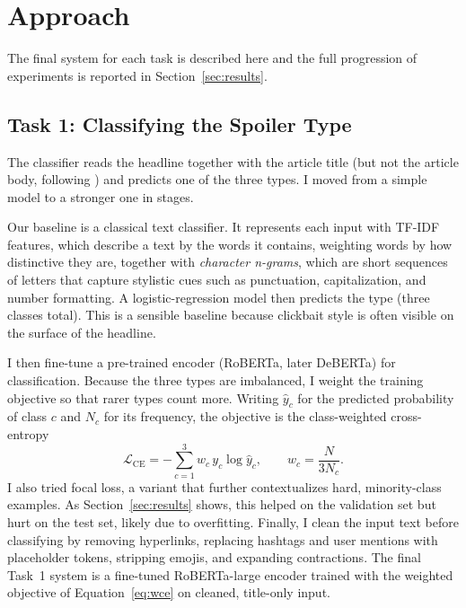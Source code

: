 \documentclass[11pt]{article}
\begin{document}
\section{Approach}
\label{sec:approach}
The final system for each task is described here and the full progression
of experiments is reported in Section~\ref{sec:results}.

\subsection{Task 1: Classifying the Spoiler Type}
The classifier reads the headline together with the article title (but not the
article body, following \citet{chickadams2023}) and predicts one of the three
types. I moved from a simple model to a stronger one in stages.

Our baseline is a classical text classifier. It represents each input with TF-IDF
features, which describe a text by the words it contains, weighting words by how
distinctive they are, together with \textit{character n-grams}, which are short sequences of
letters that capture stylistic cues such as punctuation, capitalization, and
number formatting. A logistic-regression model then predicts the type (three classes total). This is a
sensible baseline because clickbait style is often visible on the surface of the
headline.


I then fine-tune a pre-trained encoder (RoBERTa, later DeBERTa) for classification. Because the three types are imbalanced, I weight
the training objective so that rarer types count more. Writing $\hat{y}_c$ for the
predicted probability of class $c$ and $N_c$ for its frequency, the objective is
the class-weighted cross-entropy
\begin{equation}
  \mathcal{L}_{\text{CE}} = -\sum_{c=1}^{3} w_c\, y_c \log \hat{y}_c,
  \qquad w_c = \frac{N}{3 N_c}.
  \label{eq:wce}
\end{equation}
I also tried focal loss, a variant that further contextualizes hard, minority-class
examples. As Section~\ref{sec:results} shows, this helped on the validation set
but hurt on the test set, likely due to overfitting. Finally, I clean the input text before classifying by
removing hyperlinks, replacing hashtags and user mentions with placeholder
tokens, stripping emojis, and expanding contractions. The final Task~1 system is
a fine-tuned RoBERTa-large encoder trained with the weighted objective of
Equation~\ref{eq:wce} on cleaned, title-only input.
\end{document}
